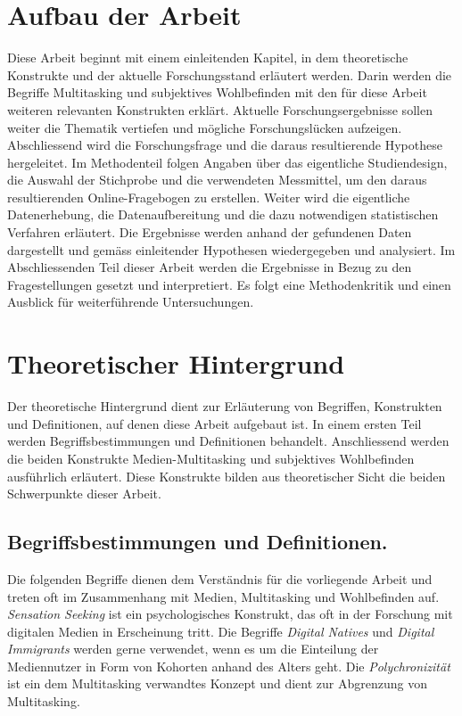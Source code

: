 \section{Aufbau der Arbeit}\label{section.einleitung.aufbau}
Diese Arbeit beginnt mit einem einleitenden Kapitel, in dem theoretische Konstrukte und der aktuelle Forschungsstand erläutert werden. Darin werden die Begriffe Multitasking und subjektives Wohlbefinden mit den für diese Arbeit weiteren relevanten Konstrukten erklärt. Aktuelle Forschungsergebnisse sollen weiter die Thematik vertiefen und mögliche Forschungslücken aufzeigen. Abschliessend wird die Forschungsfrage und die daraus resultierende Hypothese hergeleitet. Im Methodenteil folgen Angaben über das eigentliche Studiendesign, die Auswahl der Stichprobe und die verwendeten Messmittel, um den daraus resultierenden Online-Fragebogen zu erstellen. Weiter wird die eigentliche Datenerhebung, die Datenaufbereitung und die dazu notwendigen statistischen Verfahren erläutert. Die Ergebnisse werden anhand der gefundenen Daten dargestellt und gemäss einleitender Hypothesen wiedergegeben und analysiert. Im Abschliessenden Teil dieser Arbeit werden die Ergebnisse in Bezug zu den Fragestellungen gesetzt und interpretiert. Es folgt eine Methodenkritik und einen Ausblick für weiterführende Untersuchungen.

\section{Theoretischer Hintergrund}\label{section.einleitung.theoHintegrund}
Der theoretische Hintergrund dient zur Erläuterung von Begriffen, Konstrukten und Definitionen, auf denen diese Arbeit aufgebaut ist. In einem ersten Teil werden Begriffsbestimmungen und Definitionen behandelt. Anschliessend werden die beiden Konstrukte Medien-Multitasking und subjektives Wohlbefinden ausführlich erläutert. Diese Konstrukte bilden aus theoretischer Sicht die beiden Schwerpunkte dieser Arbeit.
\subsection{Begriffsbestimmungen und Definitionen.}
\label{subsection.begriffsbestimmung}
Die folgenden Begriffe dienen dem Verständnis für die vorliegende Arbeit und treten oft im Zusammenhang mit Medien, Multitasking und Wohlbefinden auf. \textit{Sensation Seeking} ist ein psychologisches Konstrukt, das oft in der Forschung mit digitalen Medien in Erscheinung tritt. Die Begriffe \textit{Digital Natives} und \textit{Digital Immigrants} werden gerne verwendet, wenn es um die Einteilung der Mediennutzer in Form von Kohorten anhand des Alters geht. Die \textit{Polychronizität} ist ein dem Multitasking verwandtes Konzept und dient zur Abgrenzung von Multitasking.   

